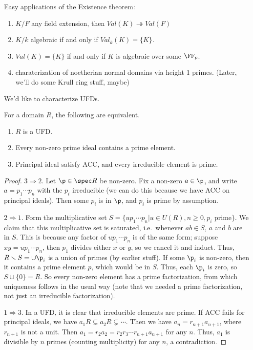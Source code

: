  Easy applications of the Existence theorem:
 \begin{enumerate}
   \item $K/F$ any field extension, then $Val(K)\twoheadrightarrow Val(F)$
   \item $K/k$ algebraic if and only if $Val_k(K)=\{K\}$.
   \item $Val(K)=\{K\}$ if and only if $K$ is algebraic over some $\FF_p$.
   \item charaterization of noetherian normal domains via height 1 primes. (Later, we'll
   do some Krull ring stuff, maybe)
 \end{enumerate}

 We'd like to characterize UFDs.
 \begin{theorem}
   For a domain $R$, the following are equivalent.
   \begin{enumerate}
     \item $R$ is a UFD.
     \item Every non-zero prime ideal contains a prime element.
     \item Principal ideal satisfy ACC, and every irreducible element is prime.
   \end{enumerate}
 \end{theorem}
 \begin{proof}
   $3\Rightarrow 2$. Let $\p\in \spec R$ be non-zero. Fix a non-zero $a\in \p$, and write
   $a=p_1\cdots p_n$ with the $p_i$ irreducible (we can do this because we have ACC on
   principal ideals). Then some $p_i$ is in $\p$, and $p_i$ is prime by assumption.

   $2\Rightarrow 1$. Form the multiplicative set $S=\{up_1\cdots p_n|u\in U(R), n\ge 0,
   p_i \text{ prime}\}$. We claim that this multiplicative set is saturated,
   i.e.~whenever $ab\in S$, $a$ and $b$ are in $S$. This is because any factor of
   $up_1\cdots p_n$ is of the same form; suppose $xy=up_1\cdots p_n$, then $p_1$ divides
   either $x$ or $y$, so we cancel it and induct. Thus, $R\smallsetminus S=\cup \p_i$ is
   a union of primes (by earlier stuff). If some $\p_i$ is non-zero, then it contains a
   prime element $p$, which would be in $S$. Thus, each $\p_i$ is zero, so
   $S\cup\{0\}=R$. So every non-zero element has a prime factorization, from which
   uniqueness follows in the usual way (note that we needed a prime factorization, not
   just an irreducible factorization).

   $1\Rightarrow 3$. In a UFD, it is clear that irreducible elements are prime. If ACC
   fails for principal ideals, we have $a_1R\subsetneq a_2R \subsetneq \cdots$. Then we
   have $a_n=r_{n+1} a_{n+1}$, where $r_{n+1}$ is not a unit. Then
   $a_1=r_2a_2=r_2r_3\cdots r_{n+1}a_{n+1}$ for any $n$. Thus, $a_1$ is divisible by $n$
   primes (counting multiplicity) for any $n$, a contradiction.
 \end{proof}
